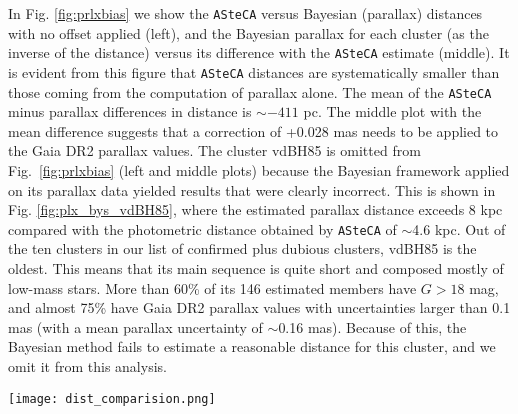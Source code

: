 \documentclass[draft]{aa}
\begin{document}
In Fig. \ref{fig:prlxbias} we show the \texttt{ASteCA} versus Bayesian 
(parallax) distances with no offset applied (left), and the Bayesian
parallax for each cluster (as the inverse of the distance) versus its
difference with the \texttt{ASteCA} estimate (middle).
%
It is evident from this figure that \texttt{ASteCA} distances are
systematically smaller than those coming from the computation of parallax
alone. The mean of the \texttt{ASteCA} minus parallax differences in
distance is $\sim-411$ pc.
The middle plot with the mean difference suggests that a correction of
+0.028 mas needs to be applied to the Gaia DR2 parallax values.
%
The cluster vdBH85 is omitted from Fig.~\ref{fig:prlxbias} (left and
middle plots) because the Bayesian framework applied on its parallax data
yielded results that were clearly incorrect. This is shown in Fig. 
\ref{fig:plx_bys_vdBH85}, where the estimated parallax distance exceeds 8 kpc compared with the photometric distance obtained by \texttt{ASteCA} of $\sim$4.6 kpc.
Out of the ten clusters in our list of confirmed plus dubious clusters, vdBH85
is the oldest. This means that its main sequence is quite short and
composed mostly of low-mass stars.
More than 60\% of its 146 estimated members have $G>18$ mag, and almost
75\% have Gaia DR2 parallax values with uncertainties larger than 0.1 mas 
(with a mean parallax uncertainty of $\sim$0.16 mas). Because of this, the
Bayesian method fails to estimate a reasonable distance for this cluster,
and we omit it from this analysis.\\

\begin{figure*}[ht]
    \centering
    \texttt{[image: dist\_comparision.png]}
\caption{Left: \texttt{ASteCA} (photometric) vs. Bayesian (parallax)
distances for the clusters listed in Table~\ref{tab:final_tab} that are
confirmed to be real clusters. No bias correction was applied to the parallax
data. The color bar at the right indicates $\log(age)$ values.
Center: Offset (\texttt{ASteCA} - Bayes) for distances expressed as
parallax in miliarcseconds.
Right: Same as left plot, with bias corrections from Lindegren et al.
(+0.029 mas).
The cluster vdBH85 is included here; its distance value is estimated from the
list of individual distances reported by \cite{BailerJones_2018}.
}
    \label{fig:prlxbias}
\end{figure*}
\end{document}
